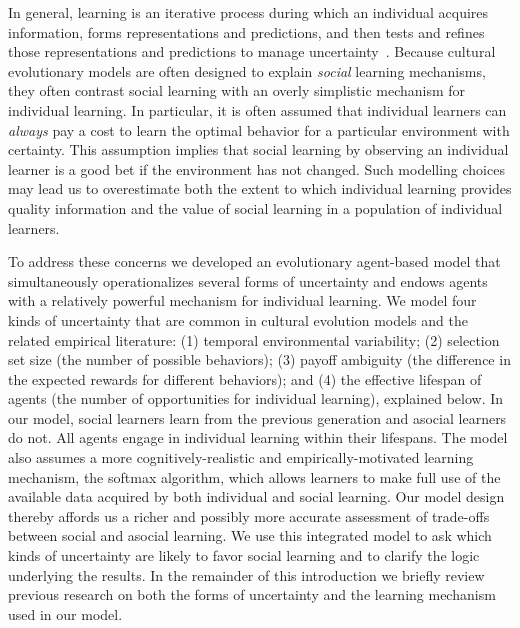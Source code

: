 \documentclass[letterpaper,11.5pt]{scrartcl}
\begin{document}
In general, learning is an iterative process during which an individual acquires information, forms representations and predictions, and then tests and refines those representations and predictions to manage uncertainty~\cite{jacobs2011bayesian,clark2013whatever}.  Because cultural evolutionary
models are often designed to explain \emph{social} learning mechanisms, they often contrast social learning with an overly simplistic mechanism for individual learning. In particular, it is often assumed that individual learners can \emph{always} pay a cost to learn the optimal behavior for a particular environment with certainty. This assumption implies that social learning by observing an individual learner is a good bet if the environment has not changed. Such modelling choices may lead us to overestimate both the extent to which individual learning provides
quality information and the value of social learning in a population of individual learners. %

To address these concerns we developed an evolutionary agent-based model that
simultaneously operationalizes several forms of uncertainty and endows agents
with a relatively powerful mechanism for individual learning. We model four kinds of
uncertainty that are common in cultural evolution models and the related empirical
literature:  (1) temporal environmental variability; (2) selection set size (the number of
possible behaviors); (3) payoff ambiguity (the difference in the expected rewards for
different behaviors); and (4) the effective lifespan of agents (the number of
opportunities for individual learning), explained below. In our model, social learners learn from the previous generation and asocial learners do not. All agents engage in individual learning within
their lifespans. The model also assumes a more
cognitively-realistic and empirically-motivated learning mechanism, the softmax algorithm, which allows learners to make full use of the available data acquired by both individual and social learning. 
Our model design thereby affords us a richer and possibly more accurate assessment of trade-offs between 
social and asocial learning. 
We use this integrated model to ask which kinds of uncertainty are likely to favor social learning and to clarify the logic underlying the results.
In the remainder of this introduction we briefly review previous research on both the forms of uncertainty and the learning mechanism used in our model. 
\end{document}
